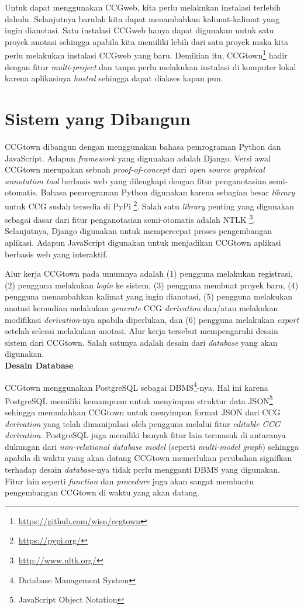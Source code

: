 Untuk dapat menggunakan CCGweb, kita perlu melakukan instalasi terlebih dahulu.
Selanjutnya barulah kita dapat menambahkan kalimat-kalimat yang ingin dianotasi.
Satu instalasi CCGweb hanya dapat digunakan untuk satu proyek anotasi sehingga
apabila kita memiliki lebih dari satu proyek maka kita perlu melakukan instalasi
CCGweb yang baru.
Demikian itu, CCGtown\footnote{\url{https://github.com/wisn/ccgtown}} hadir dengan
fitur \textit{multi-project} dan tanpa perlu melakukan instalasi di komputer lokal
karena aplikasinya \textit{hosted} sehingga dapat diakses kapan pun.



\section{Sistem yang Dibangun}

CCGtown dibangun dengan menggunakan bahasa pemrograman Python dan JavaScript.
Adapun \textit{framework} yang digunakan adalah Django.
Versi awal CCGtown merupakan sebuah \textit{proof-of-concept} dari
\textit{open source graphical annotation tool} berbasis web yang dilengkapi dengan fitur
penganotasian semi-otomatis.
Bahasa pemrograman Python digunakan karena sebagian besar \textit{library} untuk CCG
sudah tersedia di PyPi \footnote{\url{https://pypi.org/}}.
Salah satu \textit{library} penting yang digunakan sebagai dasar dari fitur penganotasian
semi-otomatis adalah NTLK \footnote{\url{http://www.nltk.org/}}.
Selanjutnya, Django digunakan untuk mempercepat proses pengembangan aplikasi.
Adapun JavaScript digunakan untuk menjadikan CCGtown aplikasi berbasis web yang interaktif.

Alur kerja CCGtown pada umumnya adalah (1) pengguna melakukan registrasi, (2) pengguna
melakukan \textit{login} ke sistem, (3) pengguna membuat proyek baru, (4) pengguna
menambahkan kalimat yang ingin dianotasi, (5) pengguna melakukan anotasi kemudian melakukan
\textit{generate} CCG \textit{derivation} dan/atau melakukan modifikasi
\textit{derivation}-nya apabila diperlukan, dan (6) pengguna melakukan \textit{export}
setelah selesai melakukan anotasi. Alur kerja tersebut mempengaruhi desain sistem dari
CCGtown. Salah satunya adalah desain dari \textit{database} yang akan digunakan.
\\


\noindent\textbf{Desain Database}

CCGtown menggunakan PostgreSQL sebagai
DBMS\footnote{Database Management System}-nya.
Hal ini karena PostgreSQL memiliki kemampuan untuk menyimpan struktur data
JSON\footnote{JavaScript Object Notation} sehingga memudahkan CCGtown untuk menyimpan
format JSON dari CCG \textit{derivation} yang telah dimanipulasi oleh pengguna melalui
fitur \textit{editable CCG derivation}.
PostgreSQL juga memiliki banyak fitur lain termasuk di antaranya dukungan
dari \textit{non-relational database model} (seperti \textit{multi-model graph})
sehingga apabila di waktu yang akan datang CCGtown memerlukan perubahan signifkan
terhadap desain \textit{database}-nya tidak perlu mengganti DBMS yang digunakan.
Fitur lain seperti \textit{function} dan \textit{procedure} juga akan sangat membantu
pengembangan CCGtown di waktu yang akan datang.

